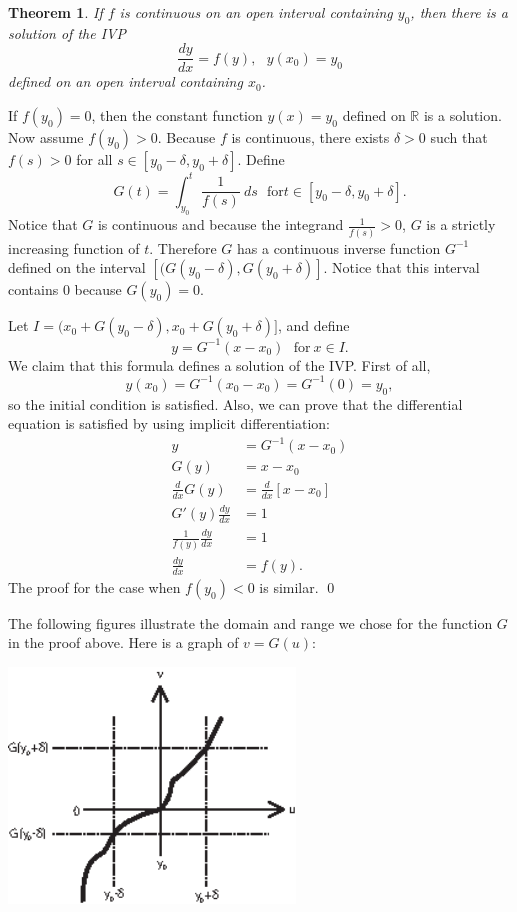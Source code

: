 \documentclass[12pt,letterpaper,twoside]{amsart}
\newtheorem{theorem}{Theorem}
\begin{document}
\begin{theorem} If $f$ is continuous on an open interval containing $y_0$, then there is a solution of the IVP
\[ \frac{dy}{dx}=f(y), \ \ \ y(x_0)=y_0\]
defined on an open interval containing $x_0$.
\end{theorem}

If $f(y_0)=0$, then the constant function $y(x)=y_0$ defined on $\mathbb{R}$ is a solution.  Now assume $f(y_0)>0$.  Because $f$ is continuous, there exists $\delta>0$ such that $f(s)>0$ for all $s \in [y_0-\delta, y_0+\delta]$.  Define
\[ G(t) = \int_{y_0}^t \frac{1}{f(s)} \ ds \ \ \ \mbox{for} t \in [y_0-\delta,y_0+\delta].\]
Notice that $G$ is continuous and because the integrand $\frac{1}{f(s)}>0$, $G$ is a strictly increasing function of $t$.  Therefore $G$ has a continuous inverse function $G^{-1}$ defined on the interval $[(G(y_0-\delta),G(y_0+\delta)]$.  Notice that this interval contains $0$ because $G(y_0)=0$. 

Let $I= (x_0+G(y_0-\delta),x_0+G(y_0+\delta)]$, and define 
\[ y = G^{-1} (x-x_0) \ \ \ \mbox{for} \ x \in I.\]
We claim that this formula defines a solution of the IVP.  First of all, 
\[ y(x_0)=G^{-1}(x_0-x_0)=G^{-1}(0)=y_0,\]
so the initial condition is satisfied.  Also, we can prove that the differential equation is satisfied by using implicit differentiation:
\begin{align*}
y&=G^{-1}(x-x_0)\\
G(y)&=x-x_0 \\
\frac{d}{dx}G(y)&=\frac{d}{dx}[x-x_0] \\
G'(y) \frac{dy}{dx}&= 1 \\
\frac{1}{f(y)}\frac{dy}{dx}&=1 \\
\frac{dy}{dx}&=f(y).
\end{align*}
The proof for the case when $f(y_0)<0$ is similar.
\qed

The following figures illustrate the domain and range we chose for the function $G$ in the proof above.  Here is a graph of $v=G(u)$:

\begin{center}
\includegraphics[width=3in]{existence1.eps}
\end{center}
\end{document}
